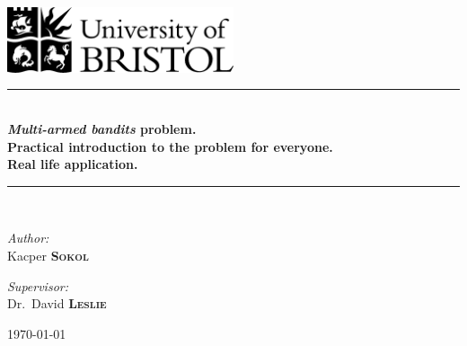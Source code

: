 \documentclass[11pt, a4paper]{report}
\newcommand{\HRule}{\rule{\linewidth}{0.5mm}}
\begin{document}
\begin{titlepage}
\begin{center}
\includegraphics[width=0.5\textwidth]{graphics/UOB-logo.png}~\\[4cm] %



\HRule \\[0.4cm]
{ \huge \bfseries \emph{Multi-armed bandits} problem.\\
	Practical introduction to the problem for everyone.\\
 	Real life application. \\[0.4cm] }
\HRule \\[1.5cm]

\begin{minipage}{0.4\textwidth}
\begin{flushleft} \large
\emph{Author:}\\
Kacper \textsc{\textbf{Sokol}}
\end{flushleft}
\end{minipage}
\begin{minipage}{0.4\textwidth}
\begin{flushright} \large
\emph{Supervisor:} \\
Dr.~David \textsc{\textbf{Leslie}}
\end{flushright}
\end{minipage}

\vfill

{\large \today}
\end{center}
\end{titlepage}

\end{document}
